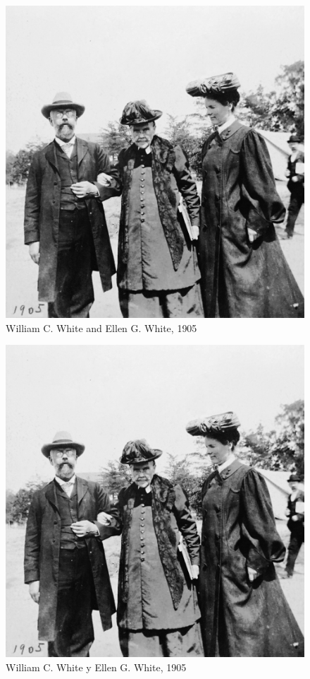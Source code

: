 \begin{figure}
    \centering
    \includegraphics[width=1\linewidth]{images/william-ellen-white-1905.jpg}
    \caption*{William C. White and Ellen G. White, 1905}
    \label{fig:w-e-white}
\end{figure}


\begin{figure}
    \centering
    \includegraphics[width=1\linewidth]{images/william-ellen-white-1905.jpg}
    \caption*{William C. White y Ellen G. White, 1905}
    \label{fig:w-e-white}
\end{figure}


